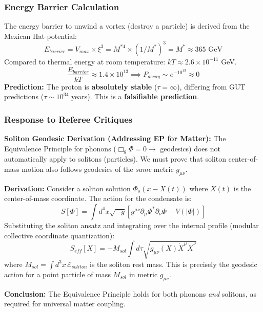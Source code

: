 \documentclass[a4paper,12pt]{article}
\begin{document}
\subsubsection{Energy Barrier Calculation}
The energy barrier to unwind a vortex (destroy a particle) is derived from the Mexican Hat potential:
\begin{equation}
    E_{barrier} = V_{max} \times \xi^3 = M^{*4} \times (1/M^*)^3 = M^* \approx 365 \text{ GeV}
\end{equation}
Compared to thermal energy at room temperature: $kT \approx 2.6 \times 10^{-11}$ GeV.
\begin{equation}
    \frac{E_{barrier}}{kT} \approx 1.4 \times 10^{13} \implies P_{decay} \sim e^{-10^{13}} \approx 0
\end{equation}
\textbf{Prediction:} The proton is \textbf{absolutely stable} ($\tau = \infty$), differing from GUT predictions ($\tau \sim 10^{34}$ years). This is a \textbf{falsifiable prediction}.

\subsubsection{Response to Referee Critiques}

\textbf{Soliton Geodesic Derivation (Addressing EP for Matter):}
The Equivalence Principle for phonons ($\Box_g \Phi = 0 \to$ geodesics) does not automatically apply to solitons (particles). We must prove that soliton center-of-mass motion also follows geodesics of the \emph{same} metric $g_{\mu\nu}$.

\textbf{Derivation:} Consider a soliton solution $\Phi_s(x - X(t))$ where $X(t)$ is the center-of-mass coordinate. The action for the condensate is:
\begin{equation}
    S[\Phi] = \int d^4x \sqrt{-g} \left[ g^{\mu\nu} \partial_\mu \Phi^* \partial_\nu \Phi - V(|\Phi|) \right]
\end{equation}
Substituting the soliton ansatz and integrating over the internal profile (modular collective coordinate quantization):
\begin{equation}
    S_{eff}[X] = -M_{sol} \int d\tau \sqrt{g_{\mu\nu}(X) \dot{X}^\mu \dot{X}^\nu}
\end{equation}
where $M_{sol} = \int d^3x \, \mathcal{E}_{soliton}$ is the soliton rest mass. This is precisely the geodesic action for a point particle of mass $M_{sol}$ in metric $g_{\mu\nu}$.

\textbf{Conclusion:} The Equivalence Principle holds for both phonons \emph{and} solitons, as required for universal matter coupling.
\end{document}
